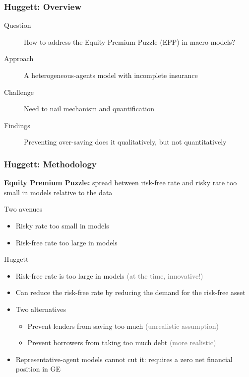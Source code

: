 \documentclass[10pt, aspectratio=1610, natbib, handout]{beamer}
\newcommand{\dimmer}[1]{\textcolor{dimgray}{#1}}
\begin{document}
  \begin{frame}
    \frametitle{Huggett: Overview}

    \begin{description}
      \item[Question] How to address the Equity Premium Puzzle (EPP) in macro models?
      \vfill\pause
      \item[Approach] A heterogeneous-agents model with incomplete insurance
      \vfill\pause
      \item[Challenge] Need to nail mechanism and quantification
      \vfill\pause
      \item[Findings] Preventing over-saving does it qualitatively, but not quantitatively
    \end{description}

  \end{frame}

  \begin{frame}
    \frametitle{Huggett: Methodology}

    \textbf{Equity Premium Puzzle:} spread between risk-free rate and risky rate too small in models relative to the data

    \vfill\pause

    Two avenues
    \begin{itemize}
      \item Risky rate too small in models
      \item Risk-free rate too large in models
    \end{itemize}

    \vfill\pause

    Huggett
    \begin{itemize}
      \item Risk-free rate is too large in models \hfill \dimmer{(at the time, innovative!)}
      \item Can reduce the risk-free rate by reducing the demand for the risk-free asset
      \item Two alternatives
        \begin{itemize}
          \item Prevent lenders from saving too much \hfill \dimmer{(unrealistic assumption)}
          \item Prevent borrowers from taking too much debt \hfill \dimmer{(more realistic)}
        \end{itemize}
      \item Representative-agent models cannot cut it: requires a zero net financial position in GE
    \end{itemize}

  \end{frame}
\end{document}

